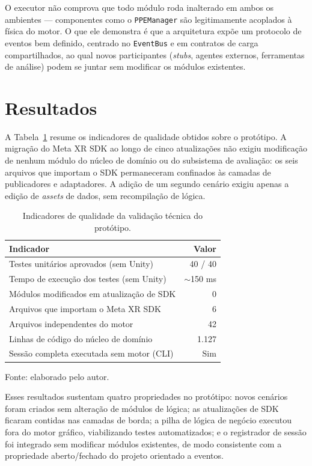 O executor não comprova que todo módulo roda inalterado em ambos os ambientes --- componentes como o \texttt{PPEManager} são legitimamente acoplados à física do motor. O que ele demonstra é que a arquitetura expõe um protocolo de eventos bem definido, centrado no \texttt{EventBus} e em contratos de carga compartilhados, ao qual novos participantes (\textit{stubs}, agentes externos, ferramentas de análise) podem se juntar sem modificar os módulos existentes.

\section{Resultados}

A Tabela~\ref{tab:validacao} resume os indicadores de qualidade obtidos sobre o protótipo. A migração do Meta XR SDK ao longo de cinco atualizações não exigiu modificação de nenhum módulo do núcleo de domínio ou do subsistema de avaliação: os seis arquivos que importam o SDK permaneceram confinados às camadas de publicadores e adaptadores. A adição de um segundo cenário exigiu apenas a edição de \textit{assets} de dados, sem recompilação de lógica.

\begin{table}[htb]
    \centering
    \caption{Indicadores de qualidade da validação técnica do protótipo.}
    \label{tab:validacao}
    \begin{tabular}{lr}
        \toprule
        \textbf{Indicador} & \textbf{Valor} \\
        \midrule
        Testes unitários aprovados (sem Unity)        & 40 / 40 \\
        Tempo de execução dos testes (sem Unity)      & $\sim$150 ms \\
        Módulos modificados em atualização de SDK     & 0 \\
        Arquivos que importam o Meta XR SDK           & 6 \\
        Arquivos independentes do motor               & 42 \\
        Linhas de código do núcleo de domínio         & 1.127 \\
        Sessão completa executada sem motor (CLI)     & Sim \\
        \bottomrule
    \end{tabular}

    {\footnotesize Fonte: elaborado pelo autor.}
\end{table}

Esses resultados sustentam quatro propriedades no protótipo: novos cenários foram criados sem alteração de módulos de lógica; as atualizações de SDK ficaram contidas nas camadas de borda; a pilha de lógica de negócio executou fora do motor gráfico, viabilizando testes automatizados; e o registrador de sessão foi integrado sem modificar módulos existentes, de modo consistente com a propriedade aberto/fechado do projeto orientado a eventos.

